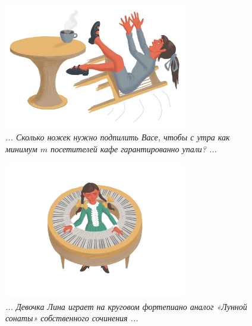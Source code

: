 \documentclass[10pt]{scrbook} \usepackage{modules/nonstahp_book}
\begin{document}
\begin{figure} \begin{center}
	\includegraphics[width=8cm]{figures/color/05c}
	\caption{
             {\itshape ... Сколько ножек нужно подпилить Васе, 
              чтобы с утра как минимум $m$ посетителей кафе гарантированно упали? ...}\\
             }
\end{center} \end{figure}

\begin{figure} \begin{center}
	\includegraphics[width=8cm]{figures/color/06}
	\caption{
             {\itshape ... Девочка Лина играет на круговом фортепиано аналог 
              «Лунной сонаты» собственного сочинения ...}\\
             }
\end{center} \end{figure}
\end{document}
